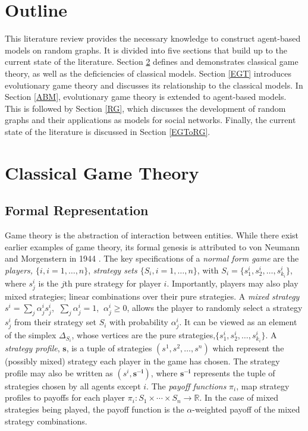 \section{Outline}
This literature review provides the necessary knowledge to construct agent-based models on random graphs. It is divided into five sections that build up to the current state of the literature. Section \ref{CGT} defines and demonstrates classical game theory, as well as the deficiencies of classical models. Section \ref{EGT} introduces evolutionary game theory and discusses its relationship to the classical models. In Section \ref{ABM}, evolutionary game theory is extended to agent-based models. This is followed by Section \ref{RG}, which discusses the development of random graphs and their applications as models for social networks. Finally, the current state of the literature is discussed in Section \ref{EGToRG}. 

\section{Classical Game Theory} \label{CGT}

\subsection{Formal Representation}
Game theory is the abstraction of interaction between entities. While there exist earlier examples of game theory, its formal genesis is attributed to von Neumann and Morgenstern in 1944 \cite{RN99, RN27}. The key specifications of a \emph{normal form game} are the \emph{players, $\{i, i = 1, \dots ,n\}$}, \emph{strategy sets $ \{S_i, i = 1, \dots ,n\}$}, with $ S_i = \{s_{1}^i, s_{2}^i,\dots, s_{k_i}^i\}$, where $s_{j}^i$ is the $j$th pure strategy for player $i$. Importantly, players may also play mixed strategies; linear combinations over their pure strategies. A \emph{mixed strategy} $s^i = \sum_{j} \alpha_j^i s_{j}^i$, $~\sum_{j} \alpha_j^i = 1$, $~\alpha_j^i \geq 0$, allows the player to randomly select a strategy $s_{j}^i$ from their strategy set $S_i$ with probability $\alpha_j^i$. It can be viewed as an element of the simplex $\Delta_{S_i}$, whose vertices are the pure strategies,$\{s_{1}^i, s_{2}^i,\dots, s_{k_i}^i\}$.  A \emph{strategy profile}, $\mathbf{s}$, is a tuple of strategies $(s^1, s^2, \dots, s^n)$ which represent the (possibly mixed) strategy each player in the game has chosen. The strategy profile may also be written as $(s^i, \mathbf{s^{-i}})$, where $\mathbf{s^{-i}}$ represents the tuple of strategies chosen by all agents except $i$. The \emph{payoff functions} $\pi_i$, map strategy profiles to payoffs for each player $\pi_i: S_1 \times \cdots \times S_n \to \mathbb R$. In the case of mixed strategies being played, the payoff function is the $\alpha$-weighted payoff of the mixed strategy combinations. \\ %



